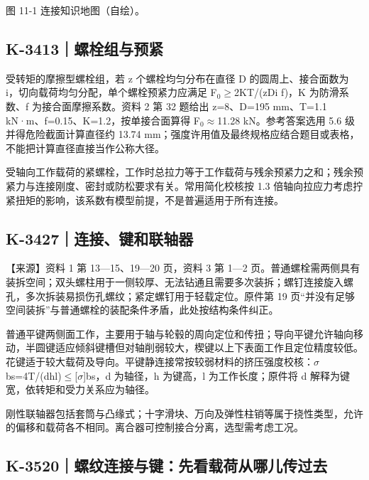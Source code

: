 \documentclass[zihao=5,a4paper,UTF8,fontset=fandol]{ctexart}
\begin{document}
图 11-1 连接知识地图（自绘）。





\subsection{K-3413｜螺栓组与预紧}
\label{k-3413}

受转矩的摩擦型螺栓组，若 z 个螺栓均匀分布在直径 D 的圆周上、接合面数为 i，切向载荷均匀分配，单个螺栓预紧力应满足 F$_{0}$$\ge$2KT/(zDi f)，K 为防滑系数、f 为接合面摩擦系数。资料 2 第 32 题给出 z=8、D=195 mm、T=1.1 kN·m、f=0.15、K=1.2，按单接合面算得 F$_{0}$$\approx$11.28 kN。参考答案选用 5.6 级并得危险截面计算直径约 13.74 mm；强度许用值及最终规格应结合题目或表格，不能把计算直径直接当作公称大径。


受轴向工作载荷的紧螺栓，工作时总拉力等于工作载荷与残余预紧力之和；残余预紧力与连接刚度、密封或防松要求有关。常用简化校核按 1.3 倍轴向拉应力考虑拧紧扭矩的影响，该系数有模型前提，不是普遍适用于所有连接。





\subsection{K-3427｜连接、键和联轴器}
\label{k-3427}

【来源】资料 1 第 13—15、19—20 页，资料 3 第 1—2 页。普通螺栓需两侧具有装拆空间；双头螺柱用于一侧较厚、无法钻通且需要多次装拆；螺钉连接旋入螺孔，多次拆装易损伤孔螺纹；紧定螺钉用于轻载定位。原件第 19 页“并没有足够空间装拆”与普通螺栓的装配条件矛盾，此处按结构条件纠正。


普通平键两侧面工作，主要用于轴与轮毂的周向定位和传扭；导向平键允许轴向移动，半圆键适应倾斜键槽但对轴削弱较大，楔键以上下表面工作且定位精度较低。花键适于较大载荷及导向。平键静连接常按较弱材料的挤压强度校核：$\sigma$bs=4T/(dhl)$\le$[$\sigma$]bs，d 为轴径，h 为键高，l 为工作长度；原件将 d 解释为键宽，依转矩和受力关系应为轴径。


刚性联轴器包括套筒与凸缘式；十字滑块、万向及弹性柱销等属于挠性类型，允许的偏移和载荷各不相同。离合器可控制接合分离，选型需考虑工况。





\subsection{K-3520｜螺纹连接与键：先看载荷从哪儿传过去}
\label{k-3520}
\end{document}
